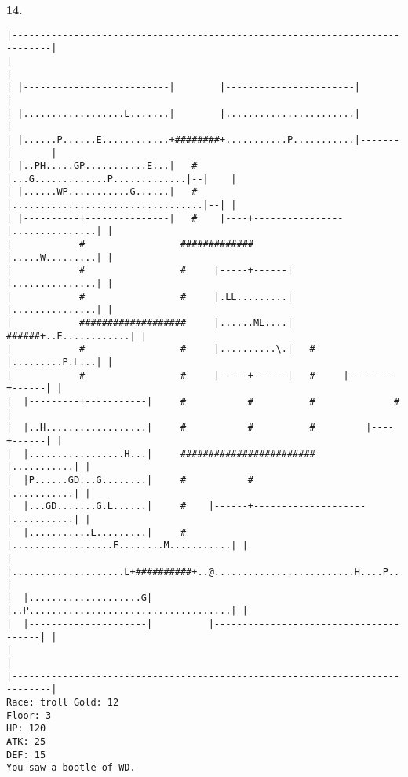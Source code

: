 \documentclass[11pt]{article}
\theoremstyle{plain}
\begin{document}
\newpage
\textbf{14. }
\begin{Verbatim}[fontsize=\scriptsize]
|-----------------------------------------------------------------------------|
|                                                                             |
| |--------------------------|        |-----------------------|               |
| |..................L.......|        |.......................|               |
| |......P......E............+########+...........P...........|-------|       |
| |..PH.....GP...........E...|   #    |...G.............P.............|--|    |
| |......WP...........G......|   #    |..................................|--| |
| |----------+---------------|   #    |----+----------------|...............| |
|            #                 #############                |.....W.........| |
|            #                 #     |-----+------|         |...............| |
|            #                 #     |.LL.........|         |...............| |
|            ###################     |......ML....|   ######+..E............| |
|            #                 #     |..........\.|   #     |.........P.L...| |
|            #                 #     |-----+------|   #     |--------+------| |
|  |---------+-----------|     #           #          #              #        |
|  |..H..................|     #           #          #         |----+------| |
|  |.................H...|     ########################         |...........| |
|  |P......GD...G........|     #           #                    |...........| |
|  |...GD.......G.L......|     #    |------+--------------------|...........| |
|  |...........L.........|     #    |..................E........M...........| |
|  |....................L+##########+..@.........................H....P.....| |
|  |....................G|          |..P....................................| |
|  |---------------------|          |---------------------------------------| |
|                                                                             |
|-----------------------------------------------------------------------------|
Race: troll Gold: 12                                                   Floor: 3
HP: 120
ATK: 25
DEF: 15
You saw a bootle of WD. 


\end{Verbatim}
\end{document}
